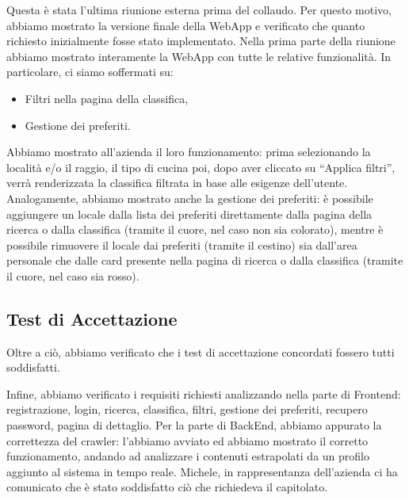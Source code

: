 Questa è stata l'ultima riunione esterna prima del collaudo. Per questo motivo, abbiamo mostrato la versione finale della WebApp e verificato che quanto richiesto inizialmente fosse stato implementato. Nella prima parte della riunione abbiamo mostrato interamente la WebApp con tutte le relative funzionalità. In particolare, ci siamo soffermati su: 

\begin{itemize}
    \item Filtri nella pagina della classifica,
    \item Gestione dei preferiti.
\end{itemize}

Abbiamo mostrato all'azienda il loro funzionamento: prima selezionando la località e/o il raggio, il tipo di cucina poi, dopo aver cliccato su “Applica filtri”, verrà renderizzata la classifica filtrata in base alle esigenze dell'utente. \\
Analogamente, abbiamo mostrato anche la gestione dei preferiti: è possibile aggiungere un locale dalla lista dei preferiti direttamente dalla pagina della ricerca o dalla classifica (tramite il cuore, nel caso non sia colorato), mentre è possibile rimuovere il locale dai preferiti (tramite il cestino) sia dall'area personale che dalle card presente nella pagina di ricerca o dalla classifica (tramite il cuore, nel caso sia rosso).

\subsection{Test di Accettazione}

Oltre a ciò, abbiamo verificato che i test di accettazione concordati fossero tutti soddisfatti.

Infine, abbiamo verificato i requisiti richiesti analizzando nella parte di Frontend: registrazione, login, ricerca, classifica, filtri, gestione dei preferiti, recupero password, pagina di dettaglio. Per la parte di BackEnd, abbiamo appurato la correttezza del crawler: l'abbiamo avviato ed abbiamo mostrato il corretto funzionamento, andando ad analizzare i contenuti estrapolati da un profilo aggiunto al sistema in tempo reale. Michele, in rappresentanza dell'azienda ci ha comunicato che è stato soddisfatto ciò che richiedeva il capitolato. 

\pagebreak
